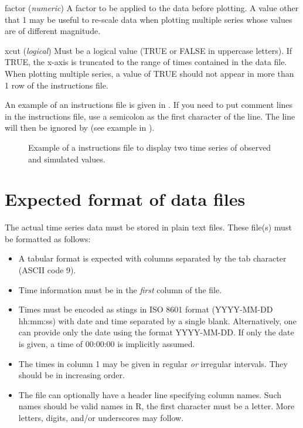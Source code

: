 \begin{columndef}
  \item [factor] (\textit{numeric}) A factor to be applied to the data before plotting. A value other that 1 may be useful to re-scale data when plotting multiple series whose values are of different magnitude.
  \item [xcut] (\textit{logical}) Must be a logical value (TRUE or FALSE in uppercase letters). If TRUE, the x-axis is truncated to the range of times contained in the data file. When plotting multiple series, a value of TRUE should not appear in more than 1 row of the instructions file.
\end{columndef}

An example of an instructions file is given in . If you need to put comment lines in the instructions file, use a semicolon as the first character of the line. The line will then be ignored by  (see example in ).

\begin{figure*}
  
  \caption[Example of a  instructions file.]{Example of a  instructions file to display two time series of observed and simulated values. \label{fig:tsplot:instructions-example}}
\end{figure*}

\section{Expected format of data files} \label{sec:tsplot:datafiles}
The actual time series data must be stored in plain text files. These file(s) must be formatted as follows:
\begin{itemize}
  \item A tabular format is expected with columns separated by the tab character (ASCII code 9).
  \item Time information must be in the \emph{first} column of the file.
  \item Times must be encoded as stings in ISO 8601 format (YYYY-MM-DD hh:mm:ss) with date and time separated by a single blank. Alternatively, one can provide only the date using the format YYYY-MM-DD. If only the date is given, a time of 00:00:00 is implicitly assumed.
  \item The times in column 1 may be given in regular \emph{or} irregular intervals. They should be in increasing order.
  \item The file can optionally have a header line specifying column names. Such names should be valid names in R, \ie{} the first character must be a letter. More letters, digits, and/or underscores may follow.
\end{itemize}

